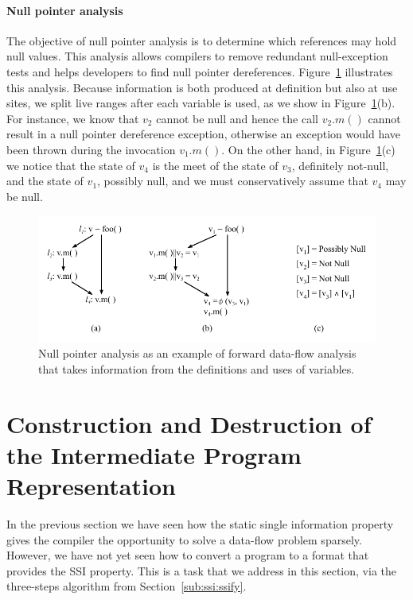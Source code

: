 \paragraph{Null pointer analysis} The objective of null pointer analysis is to determine which references may hold null values.
This analysis allows compilers to remove redundant null-exception tests and helps developers to find null pointer dereferences.
Figure~\ref{fig:ssi:nullAnalysis} illustrates this analysis.
Because information is both produced at definition but also at use sites, we split live ranges after each variable is used, as we show in Figure~\ref{fig:ssi:nullAnalysis}(b).
For instance, we know that $v_2$ cannot be null and hence the call $v_2.m()$ cannot result in a null pointer dereference exception, otherwise an exception would have been thrown during the invocation $v_1.m()$.
On the other hand, in Figure~\ref{fig:ssi:nullAnalysis}(c) we notice that the state of $v_4$ is the meet of the state of $v_3$, definitely not-null, and the state of $v_1$, possibly null, and we must conservatively assume that $v_4$ may be null.


\begin{figure}[t!]
\centering
\includegraphics[width=\linewidth]{nullAnalysis}
\caption{Null pointer analysis as an example of forward data-flow analysis that takes information from the definitions and uses of variables.} \label{fig:ssi:nullAnalysis}
\end{figure}


\section{Construction and Destruction of the Intermediate Program Representation}
\label{sec:building}
\def\Sdown{\downarrow}
\def\Sup{\uparrow}
\def\SS{{\cal P}}
\def\Out{\mathrm{Out}}
\def\In{\mathrm{In}}
\def\Defs{\mathrm{Defs}}
\def\Def{\mathrm{Def}}
\def\Uses{\mathrm{Uses}}

In the previous section we have seen how the static single information
property gives the compiler the opportunity to solve a data-flow problem sparsely.
However, we have not yet seen how to convert a program to a format that provides the SSI property.
This is a task that we address in this section, via the three-steps algorithm from Section~\ref{sub:ssi:ssify}.

